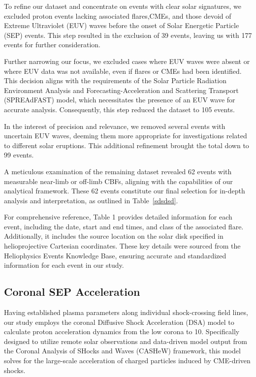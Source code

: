 To refine our dataset and concentrate on events with clear solar signatures, we excluded proton events lacking associated flares,CMEs, and those devoid of Extreme Ultraviolet (EUV) waves before the onset of Solar Energetic Particle (SEP) events. This step resulted in the exclusion of 39 events, leaving us with 177 events for further consideration.

Further narrowing our focus, we excluded cases where EUV waves were absent or where EUV data was not available, even if flares or CMEs had been identified. This decision aligns with the requirements of the Solar Particle Radiation Environment Analysis and Forecasting-Acceleration and Scattering Transport (SPREAdFAST) model, which necessitates the presence of an EUV wave for accurate analysis. Consequently, this step reduced the dataset to 105 events.

In the interest of precision and relevance, we removed several events with uncertain EUV waves, deeming them more appropriate for investigations related to different solar eruptions. This additional refinement brought the total down to 99 events.

A meticulous examination of the remaining dataset revealed 62 events with measurable near-limb or off-limb CBFs, aligning with the capabilities of our analytical framework. These 62 events constitute our final selection for in-depth analysis and interpretation, as outlined in Table~\ref{sdsdsd}.

For comprehensive reference, Table 1 provides detailed information for each event, including the date, start and end times, and class of the associated flare. Additionally, it includes the source location on the solar disk specified in helioprojective Cartesian coordinates. These key details were sourced from the Heliophysics Events Knowledge Base, ensuring accurate and standardized information for each event in our study.

\subsection{Coronal SEP Acceleration}
Having established plasma parameters along individual shock-crossing field lines, our study employs the coronal Diffusive Shock Acceleration (DSA) model \citep{kozarev_2016, kozarev_2019} to calculate proton acceleration dynamics from the low corona to 10\rsun. Specifically designed to utilize remote solar observations and data-driven model output from the Coronal Analysis of SHocks and Waves (CASHeW) framework, this model solves for the large-scale acceleration of charged particles induced by CME-driven shocks.

